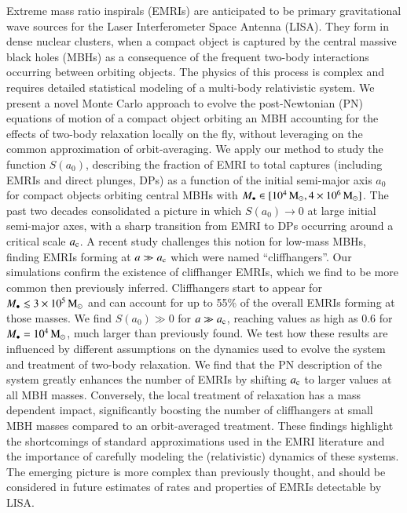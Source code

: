 \documentclass[desactivate]{aa}
\begin{document}
\abstract
{
    
    Extreme mass ratio inspirals (EMRIs) are anticipated to be primary gravitational wave sources  for the Laser Interferometer Space Antenna (LISA). They form in dense nuclear clusters, when a compact object is captured by the central massive black holes (MBHs) as a consequence of the frequent two-body interactions occurring between orbiting objects. The physics of this process is complex and requires detailed statistical modeling of a multi-body relativistic system. 
    We present a novel Monte Carlo approach to evolve the post-Newtonian (PN) equations of motion of a compact object orbiting an MBH accounting for the effects of two-body relaxation locally on the fly, without leveraging on the common approximation of orbit-averaging. We apply our method to study the function $S(a_0)$, describing the fraction of EMRI to total captures (including EMRIs and direct plunges, DPs) as a function of the initial semi-major axis $a_0$ for compact objects orbiting central MBHs with $M_\bullet\in[10^4 \,{\rm M}_{\odot}, 4\times10^6 \,{\rm M}_{\odot}]$. The past two decades consolidated a picture in which $S(a_0)\rightarrow 0$ at large initial semi-major axes, with a sharp transition from EMRI to DPs occurring around a critical scale $a_{\rm c}$. A recent study challenges this notion for low-mass MBHs, finding EMRIs forming at $a\gg a_{\rm c}$ which were named ``cliffhangers''. 
    Our simulations confirm the existence of cliffhanger EMRIs, which we find to be more common then previously inferred. Cliffhangers start to appear for $M_\bullet\lesssim3\times 10^5 \,{\rm M}_{\odot}$ and can account for up to 55\% of the overall EMRIs forming at those masses. We find $S(a_0) \gg 0$ for $a \gg a_{\rm c}$, reaching values as high as 0.6 for $M_\bullet = 10^4 \,{\rm M}_{\odot}$, much larger than previously found. We test how these results are influenced by different assumptions on the dynamics used to evolve the system and treatment of two-body relaxation. We find that the PN description of the system greatly enhances the number of EMRIs by shifting $a_{\rm c}$ to larger values at all MBH masses. Conversely, the local treatment of relaxation has a mass dependent impact, significantly boosting the number of cliffhangers at small MBH masses compared to an orbit-averaged treatment.
    These findings highlight the shortcomings of standard approximations used in the EMRI literature and the importance of carefully modeling the (relativistic) dynamics of these systems. The emerging picture is more complex than previously thought, and should be considered in future estimates of rates and properties of EMRIs detectable by LISA.  
    
}
\end{document}
